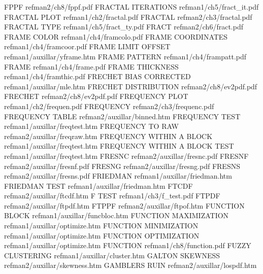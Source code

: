 FPPF                                    refman2/ch8/fppf.pdf
FRACTAL ITERATIONS                      refman1/ch5/fract_it.pdf
FRACTAL PLOT                            refman1/ch2/fractal.pdf
FRACTAL                                 refman2/ch3/fractal.pdf
FRACTAL TYPE                            refman1/ch5/fract_ty.pdf
FRACT                                   refman2/ch6/fract.pdf
FRAME COLOR                             refman1/ch4/framcolo.pdf
FRAME COORDINATES                       refman1/ch4/framcoor.pdf
FRAME LIMIT OFFSET                      refman1/auxillar/yframe.htm
FRAME PATTERN                           refman1/ch4/frampatt.pdf
FRAME                                   refman1/ch4/frame.pdf
FRAME THICKNESS                         refman1/ch4/framthic.pdf
FRECHET BIAS CORRECTED                  refman1/auxillar/mle.htm
FRECHET DISTRIBUTION                    refman2/ch8/ev2pdf.pdf
FRECHET                                 refman2/ch8/ev2pdf.pdf
FREQUENCY PLOT                          refman1/ch2/frequen.pdf
FREQUENCY                               refman2/ch3/frequenc.pdf
FREQUENCY TABLE                         refman2/auxillar/binned.htm
FREQUENCY TEST                          refman1/auxillar/freqtest.htm
FREQUENCY TO RAW                        refman2/auxillar/freqraw.htm
FREQUENCY WITHIN A BLOCK                refman1/auxillar/freqtest.htm
FREQUENCY WITHIN A BLOCK TEST           refman1/auxillar/freqtest.htm
FRESNC                                  refman2/auxillar/fresnc.pdf
FRESNF                                  refman2/auxillar/fresnf.pdf
FRESNG                                  refman2/auxillar/fresng.pdf
FRESNS                                  refman2/auxillar/fresns.pdf
FRIEDMAN                                refman1/auxillar/friedman.htm
FRIEDMAN TEST                           refman1/auxillar/friedman.htm
FTCDF                                   refman2/auxillar/ftcdf.htm
F TEST                                  refman1/ch3/f_test.pdf
FTPDF                                   refman2/auxillar/ftpdf.htm
FTPPF                                   refman2/auxillar/ftpof.htm
FUNCTION BLOCK                          refman1/auxillar/funcbloc.htm
FUNCTION MAXIMIZATION                   refman1/auxillar/optimize.htm
FUNCTION MINIMIZATION                   refman1/auxillar/optimize.htm
FUNCTION OPTIMIZATION                   refman1/auxillar/optimize.htm
FUNCTION                                refman1/ch8/function.pdf
FUZZY CLUSTERING                        refman1/auxillar/cluster.htm
GALTON SKEWNESS                         refman2/auxillar/skewness.htm
GAMBLERS RUIN                           refman2/auxillar/lospdf.htm
